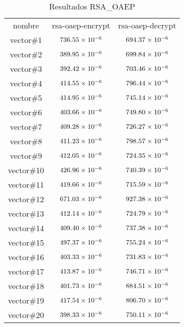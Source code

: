 \documentclass[../main.tex]{subfiles}
\begin{document}
\begin{table}[ht]
\centering{}
  \caption{Resultados RSA\_OAEP}\label{tab:rsa}
  \begin{tabular}{|c|c|c|}
    \rowcolor[HTML]{000000}
    {\color[HTML]{FFFFFF} nombre} & {\color[HTML]{FFFFFF} rsa-oaep-encrypt} & {\color[HTML]{FFFFFF} rsa-oaep-decrypt} \\
    vector\#1  & $\num{736.55E-06}$ & $\num{694.37E-06}$ \\ \hline
    \rowcolor[HTML]{C0C0C0}
    vector\#2  & $\num{389.95E-06}$ & $\num{699.84E-06}$ \\ \hline
    vector\#3  & $\num{392.42E-06}$ & $\num{703.46E-06}$ \\ \hline
    \rowcolor[HTML]{C0C0C0}
    vector\#4  & $\num{414.55E-06}$ & $\num{796.44E-06}$ \\ \hline
    vector\#5  & $\num{414.95E-06}$ & $\num{745.14E-06}$ \\ \hline
    \rowcolor[HTML]{C0C0C0}
    vector\#6  & $\num{403.66E-06}$ & $\num{749.80E-06}$ \\ \hline
    vector\#7  & $\num{409.28E-06}$ & $\num{726.27E-06}$ \\ \hline
    \rowcolor[HTML]{C0C0C0}
    vector\#8  & $\num{411.23E-06}$ & $\num{798.57E-06}$ \\ \hline
    vector\#9  & $\num{412.05E-06}$ & $\num{724.35E-06}$ \\ \hline
    \rowcolor[HTML]{C0C0C0}
    vector\#10 & $\num{426.96E-06}$ & $\num{740.39E-06}$ \\ \hline
    vector\#11 & $\num{419.66E-06}$ & $\num{715.59E-06}$ \\ \hline
    \rowcolor[HTML]{C0C0C0}
    vector\#12 & $\num{671.03E-06}$ & $\num{927.38E-06}$ \\ \hline
    vector\#13 & $\num{412.14E-06}$ & $\num{724.79E-06}$ \\ \hline
    \rowcolor[HTML]{C0C0C0}
    vector\#14 & $\num{409.40E-06}$ & $\num{737.38E-06}$ \\ \hline
    vector\#15 & $\num{497.37E-06}$ & $\num{755.24E-06}$ \\ \hline
    \rowcolor[HTML]{C0C0C0}
    vector\#16 & $\num{403.33E-06}$ & $\num{731.83E-06}$ \\ \hline
    vector\#17 & $\num{413.87E-06}$ & $\num{746.71E-06}$ \\ \hline
    \rowcolor[HTML]{C0C0C0}
    vector\#18 & $\num{401.73E-06}$ & $\num{884.51E-06}$ \\ \hline
    vector\#19 & $\num{417.54E-06}$ & $\num{806.70E-06}$ \\ \hline
    \rowcolor[HTML]{C0C0C0}
    vector\#20 & $\num{398.33E-06}$ & $\num{750.11E-06}$ \\ \hline
  \end{tabular}
\end{table}
\end{document}
